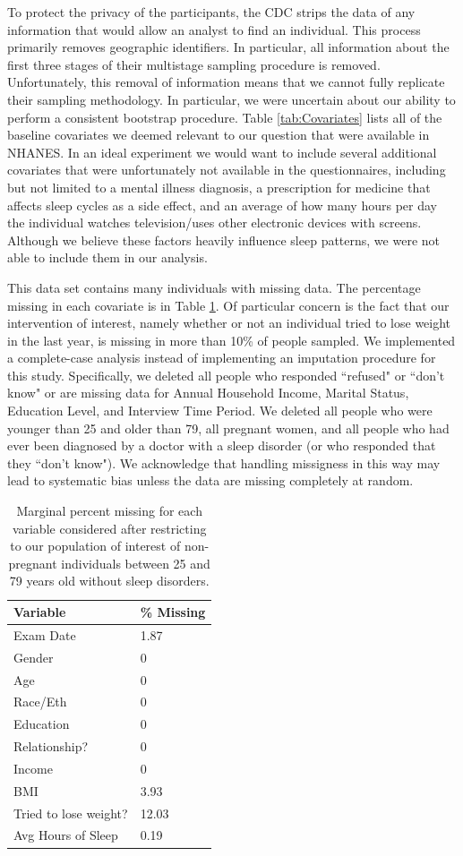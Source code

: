 \documentclass{article}
\begin{document}
To protect the privacy of the participants, the CDC strips the data of any information that would allow an analyst to find an individual.  This process primarily removes geographic identifiers. In particular, all information about the first three stages of their multistage sampling procedure is removed.  Unfortunately, this removal of information means that we cannot fully replicate their sampling methodology. In particular, we were uncertain about our ability to perform a consistent bootstrap procedure.
Table \ref{tab:Covariates}  lists all of the baseline covariates we deemed relevant to our question that were available in NHANES.  In an ideal experiment we would want to include several additional covariates that were unfortunately not available in the questionnaires, including but not limited to a mental illness diagnosis, a prescription for medicine that affects sleep cycles as a side effect, and an average of how many hours per day the individual watches television/uses other electronic devices with screens.  Although we believe these factors heavily influence sleep patterns, we were not able to include them in our analysis.

This data set contains many individuals with missing data.  The percentage missing in each covariate is in Table \ref{tab:percent.missing}. Of particular concern is the fact that our intervention of interest, namely whether or not an individual tried to lose weight in the last year, is missing in more than 10\% of people sampled.  We implemented a complete-case analysis instead of implementing an imputation procedure for this study. Specifically, we deleted all people who responded ``refused" or ``don't know" or are missing data for Annual Household Income, Marital Status, Education Level, and Interview Time Period.  We deleted all people who were younger than 25 and older than 79, all pregnant women, and all people who had ever been diagnosed by a doctor with a sleep disorder (or who responded that they ``don't know").  We acknowledge that handling missigness in this way may lead to systematic bias unless the data are missing completely at random.

\begin{table}
\centering
\begin{tabular}{|l|l|}
\hline
Variable & \% Missing \\
\hline
Exam Date & 1.87 \\
Gender & 0 \\
Age & 0 \\
Race/Eth & 0 \\
Education & 0 \\
Relationship? & 0 \\
Income & 0 \\
BMI & 3.93 \\
\hline
Tried to lose weight? & 12.03 \\
\hline
Avg Hours of Sleep & 0.19 \\
\hline
\end{tabular}
\caption{Marginal percent missing for each variable considered after restricting to our population of interest of non-pregnant individuals between 25 and 79 years old without sleep disorders.}
\label{tab:percent.missing}
\end{table}
\end{document}
